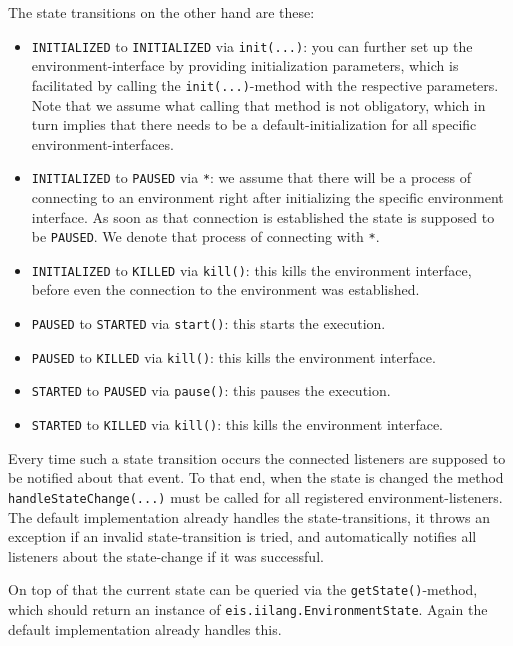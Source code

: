 \documentclass[a4]{article}
\begin{document}
The state transitions on the other hand are these:
\begin{itemize}
\item \texttt{INITIALIZED} to \texttt{INITIALIZED} via \texttt{init(...)}: you can further set up the environment-interface by providing initialization parameters, which is facilitated by calling the \texttt{init(...)}-method with the respective parameters. Note that we assume what calling that method is not obligatory, which in turn implies that there needs to
be a default-initialization for all specific environment-interfaces.
\item \texttt{INITIALIZED} to \texttt{PAUSED} via \texttt{*}: we assume that there will be a process of connecting
to an environment right after initializing the specific environment interface. As soon as that connection is established
the state is supposed to be \texttt{PAUSED}. We denote that process of connecting with \texttt{*}.
\item \texttt{INITIALIZED} to \texttt{KILLED} via \texttt{kill()}: this kills the environment interface, before even the
connection to the environment was established.
\item \texttt{PAUSED} to \texttt{STARTED} via \texttt{start()}: this starts the execution.
\item \texttt{PAUSED} to \texttt{KILLED} via \texttt{kill()}: this kills the environment interface.
\item \texttt{STARTED} to \texttt{PAUSED} via \texttt{pause()}: this pauses the execution.
\item \texttt{STARTED} to \texttt{KILLED} via \texttt{kill()}: this kills the environment interface.
\end{itemize}

Every time such a state transition occurs the connected listeners are supposed to be notified about that event. To that end, when the
state is changed the method  \texttt{handleStateChange(...)} must be called for all registered environment-listeners.
The default implementation already handles the state-transitions, it throws an exception if an invalid state-transition
is tried, and automatically notifies all listeners about the state-change if it was successful.

On top of that the current state can be queried via the \texttt{getState()}-method, which should return an instance of
\texttt{eis.iilang.EnvironmentState}. Again the default implementation already handles this.
\end{document}
